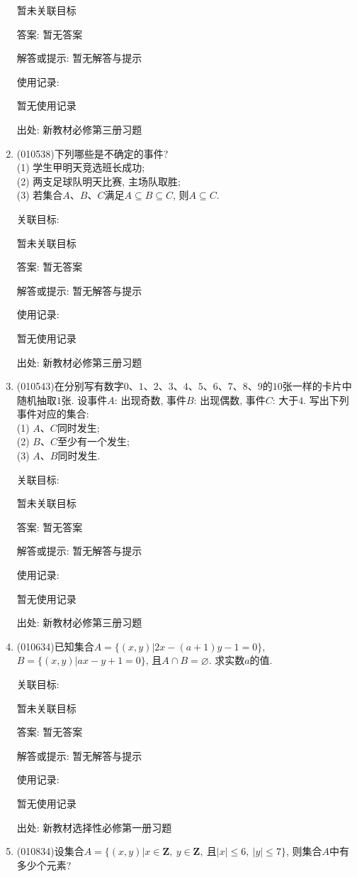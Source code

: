 \documentclass[10pt,a4paper]{article}
\begin{document}
\begin{enumerate}[1.]
暂未关联目标

答案: 暂无答案

解答或提示: 暂无解答与提示

使用记录:

暂无使用记录


出处: 新教材必修第三册习题
\item { (010538)}下列哪些是不确定的事件?\\
(1) 学生甲明天竞选班长成功;\\
(2) 两支足球队明天比赛, 主场队取胜;\\
(3) 若集合$A$、$B$、$C$满足$A\subseteq B\subseteq C$, 则$A\subseteq C$.


关联目标:

暂未关联目标

答案: 暂无答案

解答或提示: 暂无解答与提示

使用记录:

暂无使用记录


出处: 新教材必修第三册习题
\item { (010543)}在分别写有数字$0$、$1$、$2$、$3$、$4$、$5$、$6$、$7$、$8$、$9$的$10$张一样的卡片中随机抽取$1$张. 设事件$A$: 出现奇数, 事件$B$: 出现偶数, 事件$C$: 大于$4$. 写出下列事件对应的集合:\\
(1) $A$、$C$同时发生;\\
(2) $B$、$C$至少有一个发生;\\
(3) $A$、$B$同时发生.


关联目标:

暂未关联目标

答案: 暂无答案

解答或提示: 暂无解答与提示

使用记录:

暂无使用记录


出处: 新教材必修第三册习题
\item { (010634)}已知集合$A=\{(x, y)|2x-(a+1)y-1=0\}$, $B=\{(x, y)|ax-y+1=0\}$, 且$A\cap B=\varnothing$. 求实数$a$的值.


关联目标:

暂未关联目标

答案: 暂无答案

解答或提示: 暂无解答与提示

使用记录:

暂无使用记录


出处: 新教材选择性必修第一册习题
\item { (010834)}设集合$A=\{(x, y)|x\in \mathbf{Z}, \  y\in \mathbf{Z}, \  \text{且}|x|\le 6, \ |y|\le 7\}$, 则集合$A$中有多少个元素?



\end{enumerate}
\end{document}
